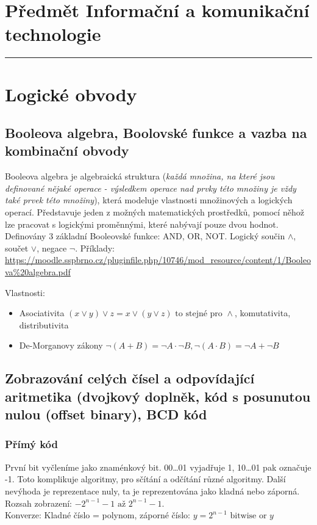 \section*{Předmět Informační a komunikační technologie}
\noindent\rule{\textwidth}{1pt}

\section{Logické obvody}
\subsection[Booleova algebra, funkce, komb. obvody]{Booleova algebra, Boolovské funkce a vazba na kombinační obvody}

Booleova algebra je algebraická struktura (\textit{každá množina, na které jsou definované nějaké operace - výsledkem operace nad prvky této množiny je vždy také prvek této množiny}), která modeluje vlastnosti množinových a logických operací. Představuje jeden z možných matematických prostředků, pomocí něhož lze pracovat s logickými proměnnými, které nabývají pouze dvou hodnot. Definovány 3 základní Booleovské funkce: AND, OR, NOT. Logický součin $\wedge$, součet $\vee$, negace $\neg$. 
\newline Příklady: \url{https://moodle.sspbrno.cz/pluginfile.php/10746/mod_resource/content/1/Booleova\%20algebra.pdf}

Vlastnosti:
\begin{itemize}
\item Asociativita $(x \vee y) \vee z = x \vee (y \vee z) \text{ to stejné pro } \wedge$, komutativita, distributivita
\item De-Morganovy zákony $ \neg(A + B) = \neg A \cdot \neg B, \neg (A \cdot B) = \neg A + \neg B $
\end{itemize}


\subsection[Zobrazování celých čísel a odpovídající aritmetika, BCD kód]{Zobrazování celých čísel a odpovídající aritmetika (dvojkový doplněk, kód s posunutou nulou (offset binary), BCD kód}

\subsubsection{Přímý kód}
První bit vyčleníme jako znaménkový bit. 00\ldots 01 vyjadřuje 1, 10\ldots 01 pak označuje -1. Toto komplikuje algoritmy, pro sčítání a odčítání různé algoritmy.
Další nevýhoda je reprezentace nuly, ta je reprezentována jako kladná nebo záporná. \\
Rozsah zobrazení: $-2^{n-1}-1 \text{ až } 2^{n-1}-1$.\\
Konverze: Kladné číslo = polynom, záporné číslo: $y = 2^{n-1} \text{ bitwise or } y$


